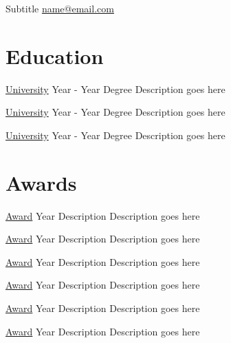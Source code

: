 \documentclass{two-column-resume}
\begin{document}
{Subtitle}
{\href{mailto:name@email.com}{name@email.com}}

\section{Education}
\begin{eventlist}

\item
{\href{https://www.link.com}{University}}%
{Year - Year}%
{Degree}%
{Description goes here}%

\item
{\href{https://www.link.com}{University}}%
{Year - Year}%
{Degree}%
{Description goes here}%

\item
{\href{https://www.link.com}{University}}%
{Year - Year}%
{Degree}%
{Description goes here}%

\end{eventlist}

\section{Awards}
\begin{eventlist}

\item
{\href{http://www.link.com}{Award}}%
{Year}%
{Description}%
{Description goes here}%

\item
{\href{http://www.www.link.com}{Award}}%
{Year}%
{Description}%
{Description goes here}%

\item
{\href{http://www.www.link.com}{Award}}%
{Year}%
{Description}%
{Description goes here}%

\item
{\href{http://www.link.com}{Award}}%
{Year}%
{Description}%
{Description goes here}%

\item
{\href{http://www.www.link.com}{Award}}%
{Year}%
{Description}%
{Description goes here}%

\item
{\href{http://www.www.link.com}{Award}}%
{Year}%
{Description}%
{Description goes here}%

\end{eventlist}

\pagebreak
\end{document}
